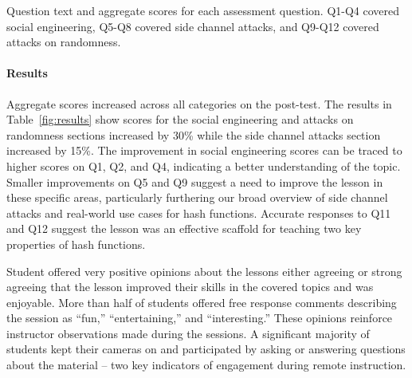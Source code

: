 \begin{table}[h]
\caption{Question text and aggregate scores for each assessment question. Q1-Q4 covered
  social engineering, Q5-Q8 covered side channel attacks, and Q9-Q12
  covered attacks on randomness.}
\label{fig:results}
\end{table}

\paragraph{Results}
Aggregate scores increased across all categories on the post-test.
The results in Table~\ref{fig:results} show scores for the social engineering and attacks on randomness sections
increased by 30\% while the side channel attacks section increased by
15\%.
The improvement in social engineering scores can be traced to
higher scores on
Q1, Q2, and Q4,
indicating a better understanding of the topic.
Smaller improvements on Q5 and Q9 suggest a need to improve the lesson in
these specific areas, particularly furthering our broad overview of side channel attacks
and real-world use cases for hash functions.
Accurate responses to Q11 and Q12
suggest the lesson was an effective scaffold for teaching two
key properties of hash functions.


Student offered very positive opinions about the lessons either agreeing or strong agreeing
that the lesson improved their skills in the covered topics
and was enjoyable.
More than half of students offered free response comments describing the
session as ``fun,'' ``entertaining,'' and ``interesting.''  These opinions reinforce instructor observations made during the sessions.  A significant majority of students kept their cameras on and participated by asking or answering questions about the material -- two key indicators of engagement during remote instruction.  

